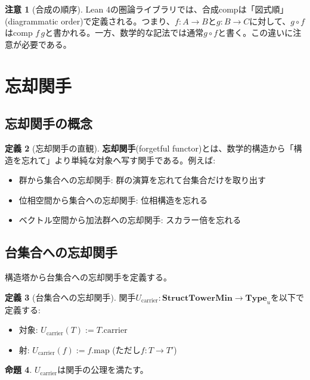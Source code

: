 \documentclass[a4paper,12pt]{article}
\theoremstyle{definition}
\newtheorem{definition}{定義}[section]
\newtheorem{proposition}[definition]{命題}
\newtheorem{remark}[definition]{注意}
\begin{document}
\begin{remark}[合成の順序]
Lean 4の圏論ライブラリでは、合成$\text{comp}$は「図式順」(diagrammatic order)で定義される。つまり、$f : A \to B$と$g : B \to C$に対して、$g \circ f$は$\text{comp } f \, g$と書かれる。一方、数学的な記法では通常$g \circ f$と書く。この違いに注意が必要である。
\end{remark}

\section{忘却関手}

\subsection{忘却関手の概念}

\begin{definition}[忘却関手の直観]
\textbf{忘却関手}(forgetful functor)とは、数学的構造から「構造を忘れて」より単純な対象へ写す関手である。例えば:
\begin{itemize}
\item 群から集合への忘却関手: 群の演算を忘れて台集合だけを取り出す
\item 位相空間から集合への忘却関手: 位相構造を忘れる
\item ベクトル空間から加法群への忘却関手: スカラー倍を忘れる
\end{itemize}
\end{definition}

\subsection{台集合への忘却関手}

構造塔から台集合への忘却関手を定義する。

\begin{definition}[台集合への忘却関手]\label{def:forget_carrier}
関手$U_{\text{carrier}} : \mathbf{StructTowerMin} \to \mathbf{Type}_u$を以下で定義する:
\begin{itemize}
\item 対象: $U_{\text{carrier}}(T) := T.\text{carrier}$
\item 射: $U_{\text{carrier}}(f) := f.\text{map}$ (ただし$f : T \to T'$)
\end{itemize}
\end{definition}

\begin{proposition}
$U_{\text{carrier}}$は関手の公理を満たす。
\end{proposition}
\end{document}
